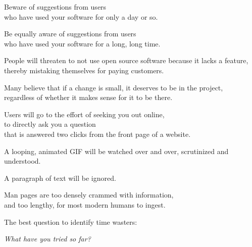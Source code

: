 \documentclass[t,aspectratio=169]{beamer}
\begin{document}
\begin{frame}[fragile]%
    \vfill
    Beware of suggestions from users \\
    who have used your software for only a day or so. \pause

    Be equally aware of suggestions from users \\
    who have used your software for a long, long time.
\end{frame}

\begin{frame}[fragile]%
    \vfill
    People will threaten to not use open source software because it lacks a feature, \pause \\
    thereby mistaking themselves for paying customers.
\end{frame}

\begin{frame}[fragile]%
    \vfill
    Many believe that if a change is small, it deserves to be in the project, \pause \\
    regardless of whether it makes sense for it to be there.
\end{frame}

\begin{frame}[fragile]%
    \vfill
    Users will go to the effort of seeking you out online, \pause \\
    to directly ask you a question \pause \\
    that is answered two clicks from the front page of a website.
\end{frame}

\begin{frame}[fragile]%
    \vfill
    A looping, animated GIF will be watched over and over, scrutinized and understood.

    \pause A paragraph of text will be ignored.
\end{frame}

\begin{frame}[fragile]%
    \vfill
    Man pages are too densely crammed with information, \\
    and too lengthy, for most modern humans to ingest.
\end{frame}

\begin{frame}[fragile]%
    \vfill
    The best question to identify time wasters: \pause

    \textit{What have you tried so far?}
\end{frame}
\end{document}

